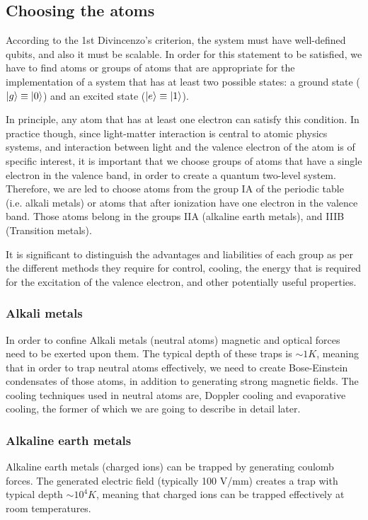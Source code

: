 \documentclass[../main.tex]{subfiles}
\begin{document}
\subsection{Choosing the atoms}
\tab According to the 1st Divincenzo's criterion, the system must have well-defined qubits, and also it must be scalable. In order for this statement to be satisfied, we have to find atoms or groups of atoms that are appropriate for the implementation of a system that has at least two possible states: a ground state ($\ket{g} \equiv \ket{0}$) and an excited state ($\ket{e} \equiv \ket{1}$). 
\par
In principle, any atom that has at least one electron can satisfy this condition. In practice though, since light-matter interaction 
is central to atomic physics systems, and interaction between light and the valence electron of the atom is of specific interest, it is important that we choose groups of atoms that have a single electron in the valence band, in order to create a quantum two-level system. Therefore, we are led to choose atoms from the group IA of the periodic table (i.e. alkali metals) or atoms that after ionization have one electron in the valence band. Those atoms belong in the groups IIA (alkaline earth metals), and IIIB (Transition metals).
\par 
It is significant to distinguish the advantages and liabilities of each group as per the different methods they require for control, cooling, the energy that is required for the excitation of the valence electron, and other potentially useful properties.

\subsubsection{Alkali metals}
In order to confine Alkali metals (neutral atoms) magnetic and optical forces need to be exerted upon them.\cite{PhysRevLett.91.010407} The typical depth of these traps is $\sim 1 K$, meaning that in order to trap neutral atoms effectively, we need to create Bose-Einstein condensates of those atoms, in addition to generating strong magnetic fields. The cooling techniques used in neutral atoms are, Doppler cooling and evaporative cooling, the former of which we are going to describe in detail later.

\subsubsection{Alkaline earth metals}
Alkaline earth metals (charged ions) can be trapped by generating coulomb forces. The generated electric field (typically 100 V/mm) creates a trap with typical depth $\sim 10^4 K$, meaning that charged ions can be trapped effectively at room temperatures.
\end{document}
